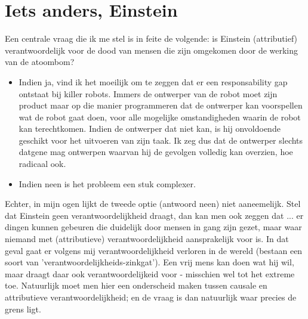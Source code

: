 \documentclass[../main/main.tex]{subfiles}
\begin{document}
\newpage
\section{Iets anders, Einstein}
Een centrale vraag die ik me stel is in feite de volgende: is Einstein (attributief) verantwoordelijk voor de dood van mensen die zijn omgekomen door de werking van de atoombom?
\begin{itemize}
\item Indien ja, vind ik het moeilijk om te zeggen dat er een responsability gap ontstaat bij killer robots. Immers de ontwerper van de robot moet zijn product maar op die manier programmeren dat de ontwerper kan voorspellen wat de robot gaat doen, voor alle mogelijke omstandigheden waarin de robot kan terechtkomen. Indien de ontwerper dat niet kan, is hij onvoldoende geschikt voor het uitvoeren van zijn taak. Ik zeg dus dat de ontwerper slechts datgene mag ontwerpen waarvan hij de gevolgen volledig kan overzien, hoe radicaal ook.
\item Indien neen is het probleem een stuk complexer.
\end{itemize}


Echter, in mijn ogen lijkt de tweede optie (antwoord neen) niet aaneemelijk. Stel dat Einstein geen verantwoordelijkheid draagt, dan kan men ook zeggen dat ... er dingen kunnen gebeuren die duidelijk door mensen in gang zijn gezet, maar waar niemand met (attributieve) verantwoordelijkheid aansprakelijk voor is. In dat geval gaat er volgens mij verantwoordelijkheid verloren in de wereld (bestaan een soort van 'verantwoordelijkheids-zinkgat'). Een vrij mens kan doen wat hij wil, maar draagt daar ook verantwoordelijkeid voor - misschien wel tot het extreme toe. Natuurlijk moet men hier een onderscheid maken tussen causale en attributieve verantwoordelijkheid; en de vraag is dan natuurlijk waar precies de grens ligt. 
\end{document}
